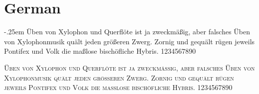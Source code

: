 

\presection\section*{\checkyes German}\postsection

\oldtextsc
{
	\kern -.25em
	Üben von Xylophon und Querflöte ist ja zweckmäßig, 
	aber falsches Üben von Xylophonmusik quält jeden größeren Zwerg.
	Zornig und gequält rügen jeweils Pontifex und Volk die maßlose bischöfliche Hybris.
	1234567890
}

\vspace{1.5em}\par\noindent
\textsc
{
	Üben von Xylophon und Querflöte ist ja zweckmäßig, 
	aber falsches Üben von Xylophonmusik quält jeden größeren Zwerg.
	Zornig und gequält rügen jeweils Pontifex und Volk die maßlose bischöfliche Hybris.
	1234567890
}